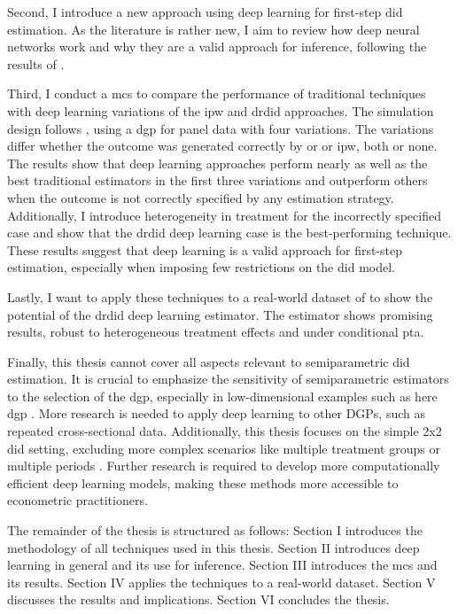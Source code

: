 Second, I introduce a new approach using deep learning for first-step \ac{did} estimation.
As the literature is rather new, I aim to review how deep neural networks work and why they are a valid approach for inference, following the results of \citet{farrellDeepNeuralNetworks2021}.

Third, I conduct a \ac{mcs} to compare the performance of traditional techniques with deep learning variations of the \ac{ipw} and \ac{drdid} approaches.
The simulation design follows \citet{santannaDoublyRobustDifferenceindifferences2020}, using a \ac{dgp} for panel data with four variations.
The variations differ whether the outcome was generated correctly by \ac{or} or \ac{ipw}, both or none.
The results show that deep learning approaches perform nearly as well as the best traditional estimators in the first three variations and outperform others when the outcome is not correctly specified by any estimation strategy.
Additionally, I introduce heterogeneity in treatment for the incorrectly specified case and show that the \ac{drdid} deep learning case is the best-performing technique.
These results suggest that deep learning is a valid approach for first-step estimation, especially when imposing few restrictions on the \ac{did} model.

Lastly, I want to apply these techniques to a real-world dataset of \citet{meyer1990workers} to show the potential of the \ac{drdid} deep learning estimator. %
The estimator shows promising results, robust to heterogeneous treatment effects and under conditional \ac{pta}.

Finally, this thesis cannot cover all aspects relevant to semiparametric \ac{did} estimation.
It is crucial to emphasize the sensitivity of semiparametric estimators to the selection of the \ac{dgp}, especially in low-dimensional examples such as here \ac{dgp} \citep{zimmert2018efficient}.
More research is needed to apply deep learning to other DGPs, such as repeated cross-sectional data.
Additionally, this thesis focuses on the simple 2x2 \ac{did} setting, excluding more complex scenarios like multiple treatment groups or multiple periods \citep[see][]{callawayDifferenceinDifferencesMultipleTime2021,goodman-baconDifferenceindifferencesVariationTreatment2021}.
Further research is required to develop more computationally efficient deep learning models, making these methods more accessible to econometric practitioners.

The remainder of the thesis is structured as follows: Section I introduces the methodology of all techniques used in this thesis.
Section II introduces deep learning in general and its use for inference.
Section III introduces the \ac{mcs} and its results.
Section IV applies the techniques to a real-world dataset.
Section V discusses the results and implications.
Section VI concludes the thesis.

